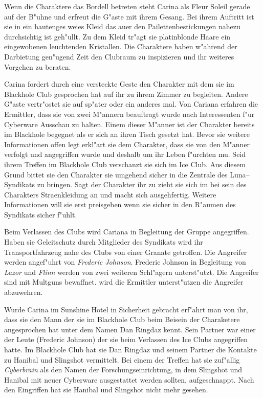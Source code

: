 Wenn die Charaktere das Bordell betreten steht Carina als Fleur Soleil gerade auf der B"uhne und erfreut die G"aste mit ihrem Gesang. Bei ihrem Auftritt ist sie in ein hautenges wei\3es Kleid das au\3er den Pailettenbestickungen nahezu durchsichtig ist geh"ullt. Zu dem Kleid tr"agt sie platinblonde Haare ein eingewobenen leuchtenden Kristallen. Die Charaktere haben w"ahrend der Darbietung gen"ugend Zeit den Clubraum zu inspizieren und ihr weiteres Vorgehen zu beraten.

Carina fordert durch eine versteckte Geste den Charakter mit dem sie im Blackhole Club gesprochen hat auf ihr zu ihrem Zimmer zu begleiten. Andere G"aste vertr"ostet sie auf sp"ater oder ein anderes mal. Von Cariana erfahren die Ermittler, dass sie von zwei M"annern beauftragt wurde nach Interessenten f"ur Cyberware Ausschau zu halten. Einem dieser M"anner ist der Charakter bereits im Blackhole begegnet als er sich an ihren Tisch gesetzt hat. Bevor sie weitere Informationen offen legt erkl"art sie dem Charakter, dass sie von den M"anner verfolgt und angegriffen wurde und deshalb um ihr Leben f"urchten mu\3. Seid ihrem Treffen im Blackhole Club verschanzt sie sich im Ice Club. Aus diesem Grund bittet sie den Charakter sie umgehend sicher in die Zentrale des Luna--Syndikats zu bringen. Sagt der Charakter ihr zu zieht sie sich im bei sein des Charakters Stra\3enkleidung an und macht sich ausgehfertig. Weitere Informationen will sie erst preisgeben wenn sie sicher in den R"aumen des Syndikats sicher f"uhlt.

Beim Verlassen des Clubs wird Cariana in Begleitung der Gruppe angegriffen. Haben sie Geleitschutz durch Mitglieder des Syndikats wird ihr Transportfahrzeug nahe des Clubs von einer Granate getroffen. Die Angreifer werden angef"uhrt von \emph{Frederic Johnson}. Frederic Johnson in Begleitung von \emph{Lazor} und \emph{Flinn} werden von zwei weiteren Schl"agern unterst"utzt. Die Angreifer sind mit Multguns bewaffnet. \xl{} wird die Ermittler unterst"utzen die Angreifer abzuwehren.

Wurde Carina im Sunshine Hotel in Sicherheit gebracht erf"ahrt man von ihr, dass sie den Mann der sie im Blackhole Club beim Beisein der Charaketere angesprochen hat unter dem Namen Dan Ringdaz kennt. Sein Partner war einer der Leute (Frederic Johnson) der sie beim Verlassen des Ice Clubs angegriffen hatte. Im Blackhole Club hat sie Dan Ringdaz und seinem Partner die Kontakte zu Hanibal und Slingshot vermittelt. Bei einem der Treffen hat sie zuf"allig \emph{Cyberbrain} als den Namen der Forschungseinrichtung, in dem Slingshot und Hanibal mit neuer Cyberware ausgestattet werden sollten, aufgeschnappt. Nach den Eingriffen hat sie Hanibal und Slingshot nicht mehr gesehen.

